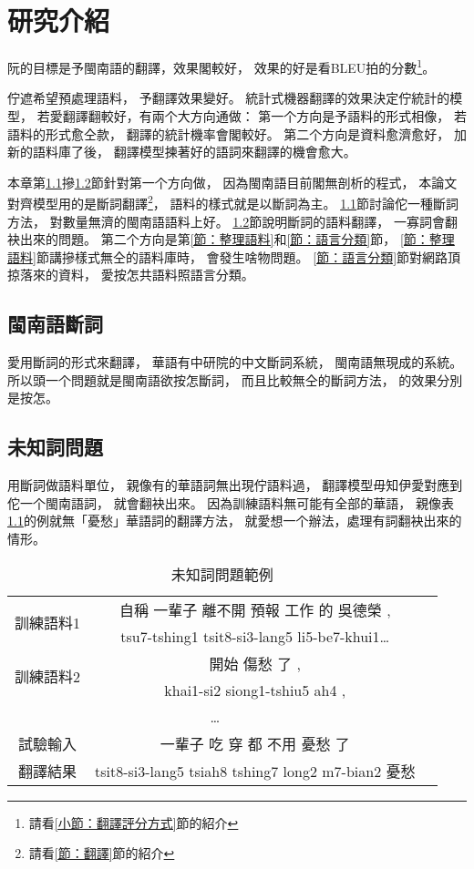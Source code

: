 \chapter{研究介紹}
\label{章：研究介紹}

阮的目標是予閩南語的翻譯，效果閣較好，
效果的好是看BLEU拍的分數\footnote{請看\ref{小節：翻譯評分方式}節的紹介}。

佇遮希望預處理語料，
予翻譯效果變好。
統計式機器翻譯的效果決定佇統計的模型，
若愛翻譯翻較好，有兩个大方向通做：
第一个方向是予語料的形式相像，
若語料的形式愈仝款，
翻譯的統計機率會閣較好。
第二个方向是資料愈濟愈好，
加新的語料庫了後，
翻譯模型揀著好的語詞來翻譯的機會愈大。

本章第\ref{節：閩南語斷詞}摻\ref{節：未知詞問題}節針對第一个方向做，
因為閩南語目前閣無剖析的程式，
本論文對齊模型用的是斷詞翻譯\footnote{請看\ref{節：翻譯}節的紹介}，
語料的樣式就是以斷詞為主。
\ref{節：閩南語斷詞}節討論佗一種斷詞方法，
對數量無濟的閩南語語料上好。
\ref{節：未知詞問題}節說明斷詞的語料翻譯，
一寡詞會翻袂出來的問題。
第二个方向是第\ref{節：整理語料}和\ref{節：語言分類}節，
\ref{節：整理語料}節講摻樣式無仝的語料庫時，
會發生啥物問題。
\ref{節：語言分類}節對網路頂掠落來的資料，
愛按怎共語料照語言分類。

\section{閩南語斷詞}
\label{節：閩南語斷詞}
愛用斷詞的形式來翻譯，
華語有中研院的中文斷詞系統，
閩南語無現成的系統。
所以頭一个問題就是閩南語欲按怎斷詞，
而且比較無仝的斷詞方法，
的效果分別是按怎。

\section{未知詞問題}
\label{節：未知詞問題}
用斷詞做語料單位，
親像有的華語詞無出現佇語料過，
翻譯模型毋知伊愛對應到佗一个閩南語詞，
就會翻袂出來。
因為訓練語料無可能有全部的華語，
親像表\ref{表：未知詞問題範例}的例就無「憂愁」華語詞的翻譯方法，
就愛想一个辦法，處理有詞翻袂出來的情形。


\begin{table}
\caption{未知詞問題範例}
\label{表：未知詞問題範例}
\centering
\begin{tabular}{ccc}
\hline
\multirow{2}{*}{訓練語料1} & 自稱 一輩子 離不開 預報 工作 的 吳德榮 , \\
 & tsu7-tshing1 tsit8-si3-lang5 li5-be7-khui1… \\
\hline
\multirow{2}{*}{訓練語料2} & 開始 傷愁 了 , \\
 & khai1-si2 siong1-tshiu5 ah4 , \\
\hline
\multicolumn{2}{c}{…} \\
\hline
\hline
試驗輸入 & 一輩子 吃 穿 都 不用 憂愁 了 \\
翻譯結果 & tsit8-si3-lang5 tsiah8 tshing7 long2 m7-bian2 憂愁 \\
\hline
\end{tabular}
\end{table}

